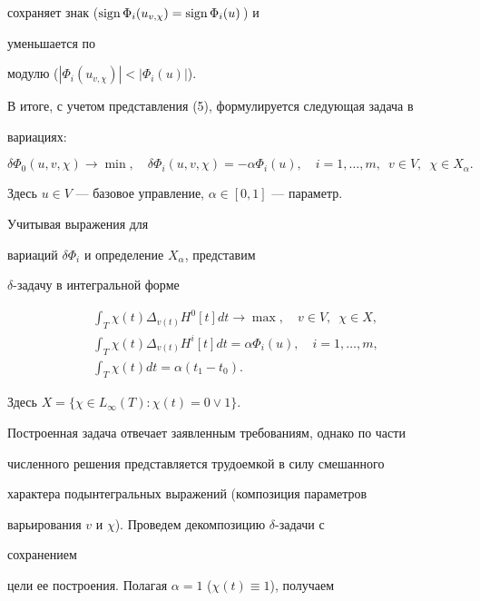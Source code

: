 сохраняет знак ($\operatorname{sign}\Phi_i(u_{v,\chi})=\operatorname{sign}\Phi_i(u)$\,) и 


уменьшается по 


модулю ($|\Phi_i(u_{v,\chi})|<|\Phi_i(u)|$). 


 


В итоге, с учетом представления (5), формулируется следующая задача в 


вариациях:


$$ 


\delta\Phi_0(u,v,\chi)\to\min,\quad  


\delta\Phi_i(u,v,\chi)=-\alpha\Phi_i(u),\quad 


i=1,\dotsc,m,\ \;v\in V,\ \;\chi\in X_\alpha. 


$$ 


Здесь $u\in V$ --- базовое управление, $\alpha\in[0,1]$ --- параметр. 


Учитывая выражения для 


вариаций $\delta\Phi_i$ и определение $X_\alpha$, представим 


$\delta$-задачу в интегральной форме 


\begin{gather*} 


\int_T\chi(t)\Delta_{v(t)}H^0[t]dt\to\max,\quad 


v\in V,\ \;\chi\in X,\\ 


\int_T\chi(t)\Delta_{v(t)}H^i[t]dt=\alpha\Phi_i(u),\quad 


i=1,\dotsc,m,\\ 


\int_T\chi(t)dt=\alpha(t_1-t_0). 


\end{gather*} 


Здесь $X=\{\chi\in L_\infty(T):\chi(t)=0\vee 1\}$. 


 


Построенная задача отвечает заявленным требованиям, однако по части 


численного решения представляется трудоемкой в силу смешанного 


характера подынтегральных выражений (композиция параметров 


варьирования $v$ и $\chi$). Проведем декомпозицию $\delta$-задачи с 


сохранением 


цели ее построения. Полагая $\alpha=1$ ($\chi(t)\equiv 1$), получаем 


